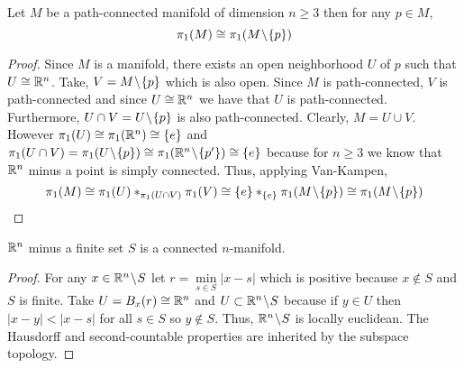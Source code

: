 \documentclass[12pt]{extarticle}
\begin{document}
\begin{lemma} \label{manifoldlessapoint}
Let $M$ be a path-connected manifold of dimension $n \ge 3$ then for any $p \in M$,
\[\pi_1(M) \cong \pi_1(M \! \setminus \! \{p\})\]
\end{lemma}
\begin{proof}
Since $M$ is a manifold, there exists an open neighborhood $U$ of $p$ such that $U \cong \mathbb{R}^n$. Take, $V = M \! \setminus \! \{p\}$ which is also open. Since $M$ is path-connected, $V$ is path-connected and since $U \cong \mathbb{R}^n$ we have that $U$ is path-connected. Furthermore, $U \cap V = U \! \setminus \! \{p\}$ is also path-connected. Clearly, $M = U \cup V$. However $\pi_1(U) \cong \pi_1(\mathbb{R}^n) \cong \{e\}$ and $\pi_1(U \cap V) = \pi_1(U \! \setminus \! \{p\}) \cong \pi_1(\mathbb{R}^n \! \setminus \! \{p'\}) \cong \{e\}$ because for $n \ge 3$ we know that $\mathbb{R}^n$ minus a point is simply connected. Thus, applying Van-Kampen, 
\[ \pi_1(M) \cong \pi_1(U) *_{\pi_1(U \cap V)} \pi_1(V) \cong \{e\} *_{\{e\}} \pi_1(M \! \setminus \! \{p\}) \cong  \pi_1(M \! \setminus \! \{p\}) \]
\end{proof}

\begin{lemma} \label{ismanifold}
$\mathbb{R}^n$ minus a finite set $S$ is a connected $n$-manifold.
\end{lemma}
\begin{proof}
For any $x \in \mathbb{R}^n \! \setminus \! S$ let $r = \min\limits_{s \in S}{|x - s|}$ which is positive because $x \notin S$ and $S$ is finite. Take $U = B_{x} \! \left(r \right) \cong \mathbb{R}^n$ and $U \subset \mathbb{R}^n \! \setminus \! S$ because if $y \in U$ then $|x - y| < |x - s|$ for all $s \in S$ so $y \notin S$. Thus, $\mathbb{R}^n \! \setminus \! S$ is locally euclidean. The Hausdorff and second-countable properties are inherited by the subspace topology. 
\end{proof}
\end{document}
